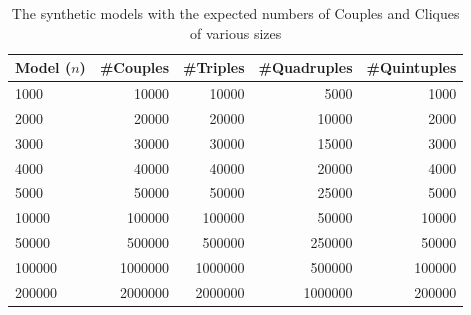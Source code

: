 \documentclass[a4paper,11pt]{article}
\begin{document}
\begin{table}[h!]
  \centering
  \begin{tabular}{| l | r | r | r | r |}
    \hline
    \textbf{Model (\(n\))} & \textbf{\#Couples} & \textbf{\#Triples} & \textbf{\#Quadruples} & \textbf{\#Quintuples}\\
    \hline
    1000   & 10000   & 10000   & 5000    & 1000\\
    2000   & 20000   & 20000   & 10000   & 2000\\
    3000   & 30000   & 30000   & 15000   & 3000\\
    4000   & 40000   & 40000   & 20000   & 4000\\
    5000   & 50000   & 50000   & 25000   & 5000\\
    10000  & 100000  & 100000  & 50000   & 10000\\
    50000  & 500000  & 500000  & 250000  & 50000\\
    100000 & 1000000 & 1000000 & 500000  & 100000\\
    200000 & 2000000 & 2000000 & 1000000 & 200000\\
    \hline
\end{tabular}
\caption{The synthetic models with the expected numbers of Couples and Cliques of various sizes}
\label{tab:synthetic-numbers}
\end{table}
\end{document}
